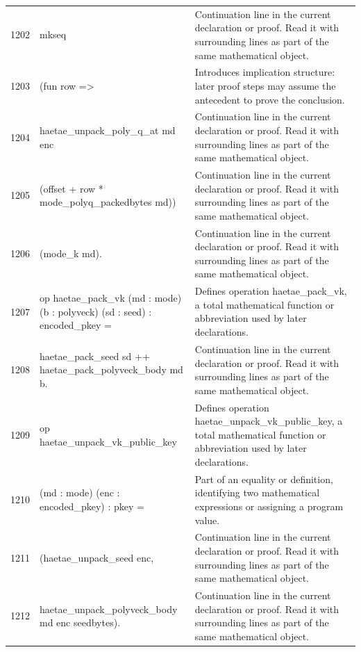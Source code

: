 \documentclass[10pt]{article}
\begin{document}
\begin{longtable}{r L{0.53\textwidth} L{0.37\textwidth}}
1202 & {\ttfamily\scriptsize   mkseq} & Continuation line in the current declaration or proof.  Read it with surrounding lines as part of the same mathematical object. \\
1203 & {\ttfamily\scriptsize     (fun row =>} & Introduces implication structure: later proof steps may assume the antecedent to prove the conclusion. \\
1204 & {\ttfamily\scriptsize       haetae\_unpack\_poly\_q\_at md enc} & Continuation line in the current declaration or proof.  Read it with surrounding lines as part of the same mathematical object. \\
1205 & {\ttfamily\scriptsize         (offset + row * mode\_polyq\_packedbytes md))} & Continuation line in the current declaration or proof.  Read it with surrounding lines as part of the same mathematical object. \\
1206 & {\ttfamily\scriptsize     (mode\_k md).} & Continuation line in the current declaration or proof.  Read it with surrounding lines as part of the same mathematical object. \\
1207 & {\ttfamily\scriptsize op haetae\_pack\_vk (md : mode) (b : polyveck) (sd : seed) : encoded\_pkey =} & Defines operation haetae\_pack\_vk, a total mathematical function or abbreviation used by later declarations. \\
1208 & {\ttfamily\scriptsize   haetae\_pack\_seed sd ++ haetae\_pack\_polyveck\_body md b.} & Continuation line in the current declaration or proof.  Read it with surrounding lines as part of the same mathematical object. \\
1209 & {\ttfamily\scriptsize op haetae\_unpack\_vk\_public\_key} & Defines operation haetae\_unpack\_vk\_public\_key, a total mathematical function or abbreviation used by later declarations. \\
1210 & {\ttfamily\scriptsize    (md : mode) (enc : encoded\_pkey) : pkey =} & Part of an equality or definition, identifying two mathematical expressions or assigning a program value. \\
1211 & {\ttfamily\scriptsize   (haetae\_unpack\_seed enc,} & Continuation line in the current declaration or proof.  Read it with surrounding lines as part of the same mathematical object. \\
1212 & {\ttfamily\scriptsize    haetae\_unpack\_polyveck\_body md enc seedbytes).} & Continuation line in the current declaration or proof.  Read it with surrounding lines as part of the same mathematical object. \\

\end{longtable}
\end{document}
